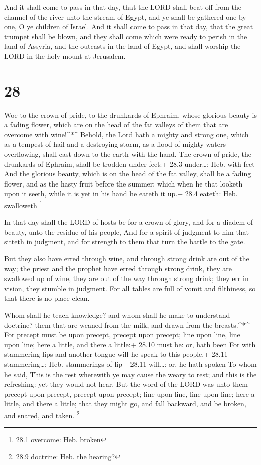  And it shall come to pass in that day, that the LORD shall
beat off from the channel of the river unto the stream of Egypt, and ye
shall be gathered one by one, O ye children of Israel.  And
it shall come to pass in that day, that the great trumpet shall be
blown, and they shall come which were ready to perish in the land of
Assyria, and the outcasts in the land of Egypt, and shall worship the
LORD in the holy mount at Jerusalem.

\hypertarget{section-27}{%
\section{28}\label{section-27}}

 Woe to the crown of pride, to the drunkards of Ephraim,
whose glorious beauty is a fading flower, which are on the head of the
fat valleys of them that are overcome with wine!\^{}*\^{} 
Behold, the Lord hath a mighty and strong one, which as a tempest of
hail and a destroying storm, as a flood of mighty waters overflowing,
shall cast down to the earth with the hand.  The crown of
pride, the drunkards of Ephraim, shall be trodden under feet:+ 28.3
under\ldots: Heb. with feet  And the glorious beauty, which
is on the head of the fat valley, shall be a fading flower, and as the
hasty fruit before the summer; which when he that looketh upon it seeth,
while it is yet in his hand he eateth it up.+ 28.4 eateth: Heb.
swalloweth \footnote{28.1 overcome: Heb. broken}

 In that day shall the LORD of hosts be for a crown of
glory, and for a diadem of beauty, unto the residue of his people,
 And for a spirit of judgment to him that sitteth in
judgment, and for strength to them that turn the battle to the gate.

 But they also have erred through wine, and through strong
drink are out of the way; the priest and the prophet have erred through
strong drink, they are swallowed up of wine, they are out of the way
through strong drink; they err in vision, they stumble in judgment.
 For all tables are full of vomit and filthiness, so that
there is no place clean.

 Whom shall he teach knowledge? and whom shall he make to
understand doctrine? them that are weaned from the milk, and drawn from
the breasts.\^{}*\^{}  For precept must be upon precept,
precept upon precept; line upon line, line upon line; here a little, and
there a little:+ 28.10 must be: or, hath been  For with
stammering lips and another tongue will he speak to this people.+ 28.11
stammering\ldots: Heb. stammerings of lip+ 28.11 will\ldots: or, he hath
spoken  To whom he said, This is the rest wherewith ye may
cause the weary to rest; and this is the refreshing: yet they would not
hear.  But the word of the LORD was unto them precept upon
precept, precept upon precept; line upon line, line upon line; here a
little, and there a little; that they might go, and fall backward, and
be broken, and snared, and taken. \footnote{28.9 doctrine: Heb. the
  hearing?}

